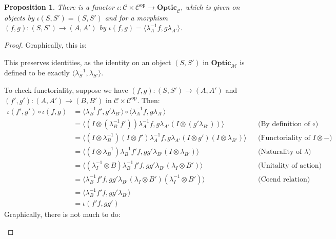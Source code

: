 \documentclass[11pt,a4paper]{article}
\theoremstyle{plain}
\newtheorem{proposition}[theorem]{Proposition}
\theoremstyle{definition}
\newcommand{\C}{\mathscr{C}}
\newcommand{\M}{\mathscr{M}}
\newcommand{\Optic}{\mathbf{Optic}}
\newcommand{\op}{\mathrm{op}}
\begin{document}
\begin{proposition}
There is a functor $\iota : \C \times \C^\op \to \Optic_\C$, which is given on objects by $\iota(S, S') = (S, S')$ and for a morphism $(f, g) : (S, S') \to (A, A')$ by $\iota(f, g) = \langle \lambda_A^{-1} f, g \lambda_{A'} \rangle$.
\end{proposition}
\begin{proof}
Graphically, this is:
\begin{center}

\end{center}

This preserves identities, as the identity on an object $(S, S')$ in $\Optic_\M$ is defined to be exactly $\langle \lambda^{-1}_S, \lambda_{S'} \rangle$.

To check functoriality, suppose we have $(f, g) : (S, S') \to (A, A')$ and $(f', g') : (A, A') \to (B, B')$ in $\C \times \C^\op$. Then:
\begin{align*}
\iota(f', g') \circ \iota(f, g) 
&= \langle \lambda^{-1}_B f', g' \lambda_{B'} \rangle \circ \langle \lambda^{-1}_A f, g \lambda_{A'} \rangle \\
&= \langle (I\otimes (\lambda^{-1}_B f'))\lambda^{-1}_A f, g \lambda_{A'} (I\otimes (g' \lambda_{B'}))\rangle && \text{(By definition of $\circ$)}\\
&= \langle (I \otimes \lambda^{-1}_B) (I \otimes f')\lambda^{-1}_A f, g \lambda_{A'} (I \otimes g')(I\otimes \lambda_{B'})\rangle && \text{(Functoriality of $I \otimes -$)}\\
&= \langle (I\otimes \lambda^{-1}_B) \lambda^{-1}_B f' f, g g' \lambda_{B'} (I\otimes \lambda_{B'})\rangle && \text{(Naturality of $\lambda$)}\\
&= \langle (\lambda^{-1}_I \otimes B) \lambda^{-1}_B f' f, g g' \lambda_{B'} (\lambda_I \otimes B')\rangle && \text{(Unitality of action)} \\
&= \langle \lambda^{-1}_B f' f, g g' \lambda_{B'} (\lambda_I \otimes B') (\lambda^{-1}_I \otimes B') \rangle && \text{(Coend relation)}  \\
&= \langle \lambda^{-1}_B f'f, g g' \lambda_{B'} \rangle \\
&= \iota(f'f, gg')
\end{align*}
Graphically, there is not much to do:
\begin{center}

\qquad \raisebox{0.3cm}{$=$} \qquad 

\end{center}

\end{proof}
\end{document}
